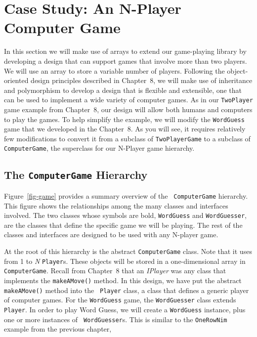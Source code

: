 \section{Case Study: An N-Player Computer Game}

\noindent In this section we will make use of arrays to extend our
game-playing library by developing a design that can support games
that involve more than two players. We will use an array to store a
variable number of players. Following the object-oriented design
principles described in Chapter~8, we will make use of inheritance and
polymorphism to develop a design that is flexible and extensible, 
one that can be used to implement a wide variety of computer games.
As in our {\tt TwoPlayer} game example from Chapter~8, our design will
allow both humans and computers to play the games.  To help simplify
the example, we will modify the {\tt WordGuess} game that we developed
in the Chapter~8. As you will see, it requires relatively few
modifications to convert it from a subclass of {\tt TwoPlayerGame} to
a subclass of {\tt ComputerGame}, the superclass for our N-Player game
hierarchy.

\subsection{The {\tt ComputerGame} Hierarchy}

\begin{figure}[bt]
\end{figure}

Figure~\ref{fig-game} provides a summary overview of the {\tt
ComputerGame} hierarchy.  This figure shows the relationships
among the many classes and interfaces involved.  The two classes whose
symbols are bold, {\tt WordGuess} and {\tt WordGuesser}, are the
classes that define the specific game we will be playing.  The
rest of the classes and interfaces are designed to be used with
any N-player game. 

At the root of this hierarchy is the abstract {\tt ComputerGame}
class.  Note that it uses from 1 to {\em N} {\tt Player}s. These
objects will be stored in a one-dimensional array in {\tt
ComputerGame}.  Recall from Chapter~8 that an {\em IPlayer} was any
class that implements the {\tt makeAMove()} method.  In this design,
we have put the abstract {\tt makeAMove()} method into the {\tt
Player} class, a class that defines a generic player of computer
games.  For the {\tt WordGuess} game, the {\tt WordGuesser} class
extends {\tt Player}.  In order to play Word Guess, we will create a
{\tt WordGuess} instance, plus one or more instances of {\tt
WordGuesser}s. This is similar to the {\tt OneRowNim} example from the
previous chapter,

